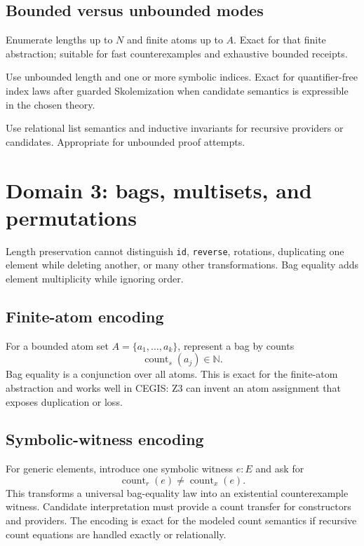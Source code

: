 \documentclass[11pt,oneside]{report}
\newcommand{\Nat}{\mathbb{N}}
\newcommand{\code}[1]{\texttt{#1}}
\begin{document}
\subsection{Bounded versus unbounded modes}

\begin{description}[leftmargin=2.2em,style=nextline]
\item[Finite-spine bounded mode.] Enumerate lengths up to $N$ and finite atoms up to $A$. Exact for that finite abstraction; suitable for fast counterexamples and exhaustive bounded receipts.
\item[Index-counterexample mode.] Use unbounded length and one or more symbolic indices. Exact for quantifier-free index laws after guarded Skolemization when candidate semantics is expressible in the chosen theory.
\item[CHC mode.] Use relational list semantics and inductive invariants for recursive providers or candidates. Appropriate for unbounded proof attempts.
\end{description}

\section{Domain 3: bags, multisets, and permutations}
\label{sec:domain-bag}

Length preservation cannot distinguish \code{id}, \code{reverse}, rotations, duplicating one element while deleting another, or many other transformations. Bag equality adds element multiplicity while ignoring order.

\subsection{Finite-atom encoding}

For a bounded atom set $A=\{a_1,\ldots,a_k\}$, represent a bag by counts
\[
  \operatorname{count}_s(a_j)\in\Nat.
\]
Bag equality is a conjunction over all atoms. This is exact for the finite-atom abstraction and works well in CEGIS: Z3 can invent an atom assignment that exposes duplication or loss.

\subsection{Symbolic-witness encoding}

For generic elements, introduce one symbolic witness $e:E$ and ask for
\[
  \operatorname{count}_{r}(e)\ne\operatorname{count}_{x}(e).
\]
This transforms a universal bag-equality law into an existential counterexample witness. Candidate interpretation must provide a count transfer for constructors and providers. The encoding is exact for the modeled count semantics if recursive count equations are handled exactly or relationally.
\end{document}
